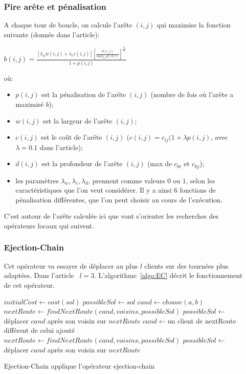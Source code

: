 \documentclass[a4paper,11pt]{article}%
\begin{document}
\subsubsection{Pire arête et pénalisation}
A chaque tour de boucle, on calcule l'arête $(i,j)$ qui maximise la fonction suivante (donnée dans l'article):
\begin{center}
$b(i,j) = \frac{[\lambda_w w(i,j) + \lambda_c c(i,j)] [\frac{d(i,j)}{max_{k,l}d(k,l)}] ^ {\frac{\lambda_d}{2}}}{1+p(i,j)}$
\end{center}
où:
\begin{itemize}
\item $p(i,j)$ est la pénalisation de l'arête $(i,j)$ (nombre de fois où l'arête a maximisé $b$);
\item $w(i,j)$ est la largeur de l'arête $(i,j)$;
\item $c(i,j)$ est le coût de l'arête $(i,j)$ ($c(i,j) = c_{ij}(1 + \lambda p(i,j)$, avec $\lambda = 0.1$ dans l'article);
\item $d(i,j)$ est la profondeur de l'arête $(i,j)$ (max de $c_{0i}$ et $c_{0j}$);
\item les paramètres $\lambda_w,\lambda_c,\lambda_d$, prennent comme valeurs $0$ ou $1$, selon les caractéristiques que l'on veut considérer. Il y a ainsi 6 fonctions de pénalisation différentes, que l'on peut choisir au cours de l'exécution.

\end{itemize}

C'est autour de l'arête calculée ici que vont s'orienter les recherches des opérateurs locaux qui suivent.
 
\subsubsection{Ejection-Chain}

Cet opérateur va essayer de déplacer au plus $l$ clients sur des tournées plus adaptées. Dans l'article~\cite{Sorensen_2017} $l = 3$.
L'algorithme~\ref{algo:EC} décrit le fonctionnement de cet opérateur.

\begin{algorithm}
\DontPrintSemicolon %
$initialCost \gets cost(sol)$\;
$possibleSol \gets sol$\;
$cand \gets choose(a,b)$\;
$nextRoute \gets findNextRoute(cand,voisins,possibleSol)$\;
$possibleSol \gets $ déplacer $cand$ après son voisin sur $nextRoute$\;
 {
  $cand \gets $un client de nextRoute différent de celui ajouté\;
  $nextRoute \gets findNextRoute(cand,voisins,possibleSol)$\;
  $possibleSol \gets$ déplacer $cand$ après son voisin sur $nextRoute$\;
}
 {
	\;
}
\;
\caption{{\sc Ejection-Chain} applique l'opérateur ejection-chain}
\label{algo:EC}
\end{algorithm}
\end{document}
